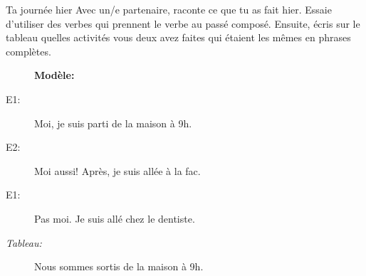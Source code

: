\begin{frame}{Ta journée hier}
  Avec un/e partenaire, raconte ce que tu as fait hier.
  Essaie d'utiliser des verbes qui prennent le verbe  au passé composé.
  Ensuite, écris sur le tableau quelles activités vous deux avez faites qui étaient les mêmes en phrases complètes. \\
  \begin{description}
    \item[] \textbf{Modèle:}
    \item[E1:] Moi, je suis parti de la maison à 9h.
    \item[E2:] Moi aussi! Après, je suis allée à la fac.
    \item[E1:] Pas moi. Je suis allé chez le dentiste.
    \item[\emph{Tableau:}] Nous sommes sortis de la maison à 9h.
  \end{description}
\end{frame}